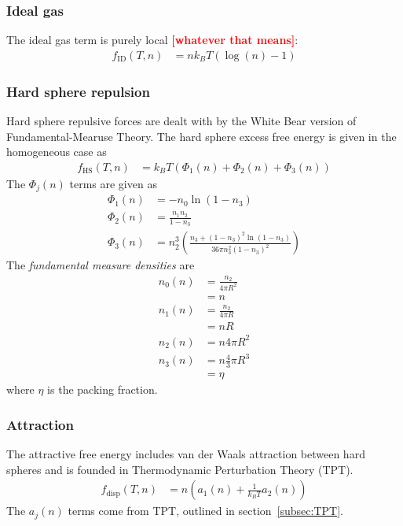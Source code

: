 \documentclass[letterpaper,twocolumn,amsmath,amssymb,prb]{revtex4-1}
\newcommand{\kT}{\ensuremath{k_BT}}
\newcommand{\fid}{\ensuremath{f_\text{ID}(T,n)}}
\newcommand{\fhs}{\ensuremath{f_\text{HS}(T,n)}}
\newcommand{\fdisp}{\ensuremath{f_\text{disp}(T,n)}}
\newcommand{\1}{\ensuremath{\textbf{r}_1}}
\newcommand{\2}{\ensuremath{\textbf{r}_2}}
\newcommand{\fixme}[1]{\textcolor{red}{\textbf{[#1]}}}
\begin{document}
\subsubsection{Ideal gas}\label{sub2sec:ID}
The ideal gas term is purely local \fixme{whatever that means}:
\begin{align}
  \fid &= n\kT\left(\log(n) - 1\right)
\end{align}

\subsubsection{Hard sphere repulsion}\label{sub2sec:HS}
Hard sphere repulsive forces are dealt with by the White Bear version of Fundamental-Mearuse Theory.\cite{Roth02} The hard sphere excess free energy is given in the homogeneous case as
\begin{align}
  \fhs &= \kT\left( \Phi_1(n) + \Phi_2(n) + \Phi_3(n) \right)
\end{align}
The $\Phi_j(n)$ terms are given as
\begin{align}
  \Phi_1(n) &= -n_0\ln(1 - n_3) \\
  \Phi_2(n) &= \frac{n_1n_2}{1 - n_3} \\
  \Phi_3(n) &= n_2^3\left( \frac{n_3 + (1 - n_3)^2\ln(1 - n_3)}{36\pi n_3^2(1 - n_3)^2} \right)
\end{align}
The \emph{fundamental measure densities} are
\begin{align}
  n_0(n) &= \frac{n_2}{4\pi R^2} \nonumber \\
  &= n \\
  n_1(n) &= \frac{n_2}{4\pi R} \nonumber \\
  &= nR \\
  n_2(n) &= n4\pi R^2 \\
  n_3(n) &= n\frac{4}{3}\pi R^3 \nonumber \\
  &= \eta
\end{align}
where $\eta$ is the packing fraction.

\subsubsection{Attraction}\label{sub2sec:disp}
The attractive free energy includes van der Waals attraction between hard spheres and is founded in Thermodynamic Perturbation Theory (TPT).
\begin{align}
  \fdisp &= n \left( a_1(n) + \frac{1}{\kT}a_2(n) \right)
\end{align}
The $a_j(n)$ terms come from TPT, outlined in section~\ref{subsec:TPT}.
\end{document}
